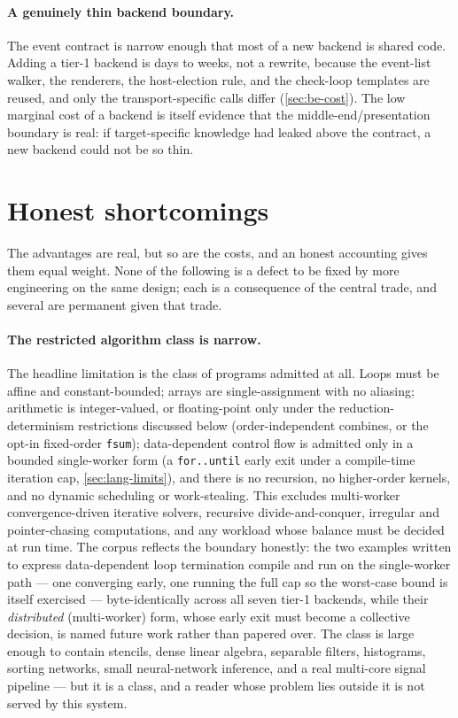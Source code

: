 \paragraph{A genuinely thin backend boundary.} The event contract is narrow enough
that most of a new backend is shared code. Adding a tier-1 backend is days to
weeks, not a rewrite, because the event-list walker, the renderers, the
host-election rule, and the check-loop templates are reused, and only the
transport-specific calls differ (\cref{sec:be-cost}). The low marginal cost of a
backend is itself evidence that the middle-end/presentation boundary is real: if
target-specific knowledge had leaked above the contract, a new backend could not
be so thin.

\section{Honest shortcomings}\label{sec:disc-shortcomings}

The advantages are real, but so are the costs, and an honest accounting gives them
equal weight. None of the following is a defect to be fixed by more engineering on
the same design; each is a consequence of the central trade, and several are
permanent given that trade.

\paragraph{The restricted algorithm class is narrow.} The headline limitation is
the class of programs admitted at all. Loops must be affine and constant-bounded;
arrays are single-assignment with no aliasing; arithmetic is integer-valued, or
floating-point only under the reduction-determinism restrictions discussed below
(order-independent combines, or the opt-in fixed-order \texttt{fsum}); data-dependent
control flow is admitted only in a bounded single-worker form (a
\texttt{for..until} early exit under a compile-time iteration cap, \cref{sec:lang-limits}),
and there is no recursion, no higher-order kernels, and no dynamic scheduling or
work-stealing. This excludes multi-worker convergence-driven iterative solvers, recursive
divide-and-conquer, irregular and pointer-chasing computations, and any workload
whose balance must be decided at run time. The corpus reflects the boundary
honestly: the two examples written to express data-dependent loop termination compile
and run on the single-worker path --- one converging early, one running the
full cap so the worst-case bound is itself exercised --- byte-identically across all
seven tier-1 backends, while their \emph{distributed} (multi-worker) form, whose early
exit must become a collective decision, is named future work rather than papered over. The class is large
enough to contain stencils, dense linear algebra, separable filters, histograms,
sorting networks, small neural-network inference, and a real multi-core signal
pipeline --- but it is a class, and a reader whose problem lies outside it is not
served by this system.

